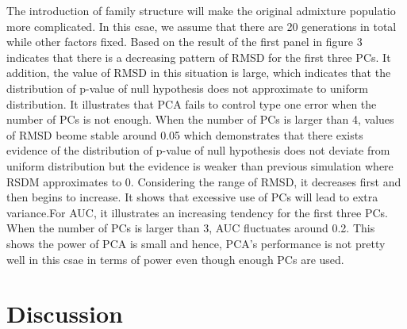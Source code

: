 \documentclass[12pt]{article}
\begin{document}
The introduction of family structure will make the original admixture populatio more complicated. In this csae, we assume that there are 20 generations in total while other factors fixed. Based on the result of the first panel in figure 3 indicates that there is a decreasing pattern of RMSD for the first three PCs. It addition, the value of RMSD in this situation is large, which indicates that the distribution of p-value of null hypothesis does not approximate to uniform distribution. It illustrates that PCA fails to control type one error when the number of PCs is not enough. When the number of PCs is larger than 4, values of RMSD beome stable around 0.05 which demonstrates that there exists evidence of the distribution of p-value of null hypothesis does not deviate from uniform distribution but the evidence is weaker than previous simulation where RSDM approximates to 0. Considering the range of RMSD, it decreases first and then begins to increase. It shows that excessive use of PCs will lead to extra variance.For AUC, it illustrates an increasing tendency for the first three PCs. When the number of PCs is larger than 3, AUC fluctuates around 0.2. This shows the power of PCA is small and hence, PCA's performance is not pretty well in this csae in terms of power even though enough PCs are used. 


\section{Discussion}
\end{document}
